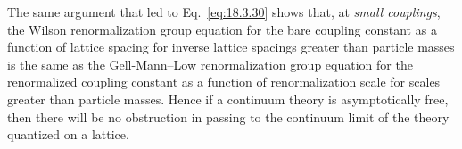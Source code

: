 The same argument that led to Eq.\ \eqref{eq:18.3.30} shows that, at \emph{small
couplings}, the Wilson renormalization group equation for the bare coupling
constant as a function of lattice spacing for inverse lattice spacings greater
than particle masses is the same as the Gell-Mann--Low renormalization
group equation for the renormalized coupling constant as a function of
renormalization scale for scales greater than particle masses. Hence if a
continuum theory is asymptotically free, then there will be no obstruction
in passing to the continuum limit of the theory quantized on a lattice.
